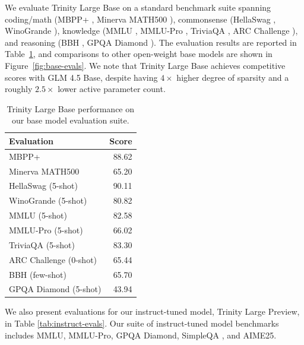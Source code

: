 \documentclass{article}
\begin{document}
We evaluate Trinity Large Base on a standard benchmark suite spanning coding/math (MBPP+ \citep{liu2023codegeneratedchatgptreally}, Minerva MATH500 \citep{lewkowycz2022solvingquantitativereasoningproblems}), commonsense (HellaSwag \citep{zellers2019hellaswagmachinereallyfinish}, WinoGrande \citep{sakaguchi2019winograndeadversarialwinogradschema}), knowledge (MMLU \citep{hendrycks2021measuringmassivemultitasklanguage}, MMLU-Pro \citep{wang2024mmluprorobustchallengingmultitask}, TriviaQA \citep{joshi2017triviaqalargescaledistantly}, ARC Challenge \citep{clark2018thinksolvedquestionanswering}), and reasoning (BBH \citep{suzgun2022challengingbigbenchtaskschainofthought}, GPQA Diamond \citep{rein2023gpqagraduatelevelgoogleproofqa}). The evaluation results are reported in Table~\ref{tab:base-evals}, and comparisons to other open-weight base models are shown in Figure~\ref{fig:base-evals}. We note that Trinity Large Base achieves competitive scores with GLM 4.5 Base, despite having $4\times$ higher degree of sparsity and a roughly $2.5\times$ lower active parameter count.


\begin{table}[t]
\centering
\caption{Trinity Large Base performance on our base model evaluation suite.}
\label{tab:base-evals}
\begin{tabular}{l r}
\toprule
\textbf{Evaluation} & \textbf{Score} \\
\midrule
MBPP+ & 88.62 \\
Minerva MATH500 & 65.20 \\
HellaSwag (5-shot) & 90.11 \\
WinoGrande (5-shot) & 80.82 \\
MMLU (5-shot) & 82.58 \\
MMLU-Pro (5-shot) & 66.02 \\
TriviaQA (5-shot) & 83.30 \\
ARC Challenge (0-shot) & 65.44 \\
BBH (few-shot) & 65.70 \\
GPQA Diamond (5-shot) & 43.94 \\
\bottomrule
\end{tabular}
\end{table}

We also present evaluations for our instruct-tuned model, Trinity Large Preview, in Table \ref{tab:instruct-evals}. Our suite of instruct-tuned model benchmarks includes MMLU, MMLU-Pro, GPQA Diamond, SimpleQA \citep{wei2024measuringshortformfactualitylarge}, and AIME25.
\end{document}
